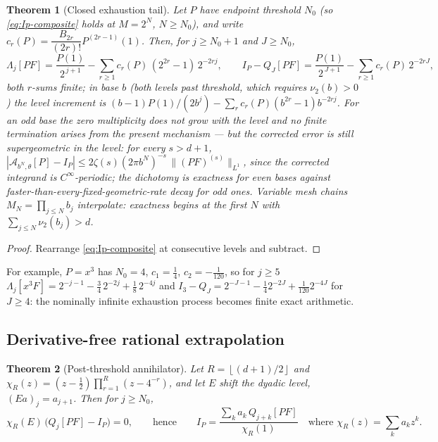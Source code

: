 \documentclass[11pt,oneside]{article}
\numberwithin{equation}{section}
\newtheorem{theorem}{Theorem}[section]
\theoremstyle{definition}
\theoremstyle{remark}
\newcommand{\vtwo}{\nu_2}
\newcommand{\abs}[1]{\left\lvert #1\right\rvert}
\newcommand{\floor}[1]{\left\lfloor #1\right\rfloor}
\begin{document}
\begin{theorem}[Closed exhaustion tail]
\label{thm:ruffa-tail}
Let $P$ have endpoint threshold $N_0$ (so
\eqref{eq:Ip-composite} holds at $M=2^{N}$, $N\ge N_0$), and write
$c_r(P)=\dfrac{B_{2r}}{(2r)!}P^{(2r-1)}(1)$.  Then, for $j\ge N_0+1$
and $J\ge N_0$,
\begin{equation}
 \Lambda_j[PF]
 =\frac{P(1)}{2^{\,j+1}}
 -\sum_{r\ge1}c_r(P)\,(2^{2r}-1)\,2^{-2rj},
 \qquad
 I_P-Q_J[PF]
 =\frac{P(1)}{2^{\,J+1}}-\sum_{r\ge1}c_r(P)\,2^{-2rJ},
 \label{eq:closed-tail}
\end{equation}
both $r$-sums finite; in base $b$ (both levels past threshold, which
requires $\vtwo(b)>0$) the level increment is
$(b-1)P(1)/(2b^{j})-\sum_rc_r(P)(b^{2r}-1)b^{-2rj}$.  For an odd base
the zero multiplicity does not grow with the level and no finite
termination arises from the present mechanism --- but the corrected
error is still \emph{supergeometric} in the level: for every
$s>d+1$,
$\abs{\mathcal A_{b^{N},\theta}[P]-I_P}
\le 2\zeta(s)(2\pi b^{N})^{-s}\,\lVert(PF)^{(s)}\rVert_{L^1}$,
since the corrected integrand is $C^\infty$-periodic; the dichotomy
is exactness for even bases against
faster-than-every-fixed-geometric-rate decay for odd ones.  Variable
mesh chains $M_N=\prod_{j\le N}b_j$ interpolate: exactness begins at
the first $N$ with $\sum_{j\le N}\vtwo(b_j)>d$.
\end{theorem}

\begin{proof}
Rearrange \eqref{eq:Ip-composite} at consecutive levels and subtract.
\end{proof}

For example, $P=x^{3}$ has $N_0=4$, $c_1=\tfrac14$,
$c_2=-\tfrac1{120}$, so for $j\ge5$
$\Lambda_j[x^{3}F]=2^{-j-1}-\tfrac34\,2^{-2j}+\tfrac18\,2^{-4j}$ and
$I_3-Q_J=2^{-J-1}-\tfrac14 2^{-2J}+\tfrac1{120}2^{-4J}$ for
$J\ge4$: the nominally infinite exhaustion process becomes finite
exact arithmetic.

\subsection{Derivative-free rational extrapolation}

\begin{theorem}[Post-threshold annihilator]
\label{thm:annihilator-comb}
Let $R=\floor{(d+1)/2}$ and
$\chi_R(z)=(z-\tfrac12)\prod_{r=1}^{R}(z-4^{-r})$, and let $E$ shift
the dyadic level, $(Ea)_j=a_{j+1}$.  Then for $j\ge N_0$,
\begin{equation}
 \chi_R(E)\,\bigl(Q_j[PF]-I_P\bigr)=0,
 \qquad\text{hence}\qquad
 I_P=\frac{\sum_{k}a_k\,Q_{j+k}[PF]}{\chi_R(1)}
 \quad\text{where }\chi_R(z)=\sum_ka_kz^{k}.
 \label{eq:annihilator}
\end{equation}
\end{theorem}
\end{document}
